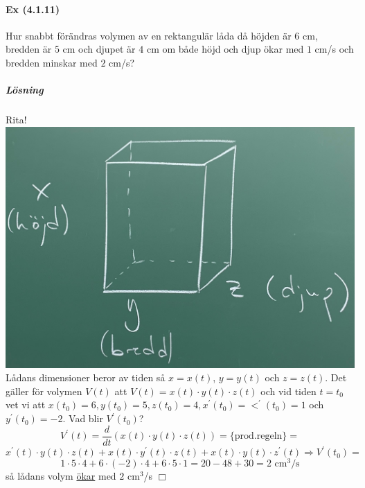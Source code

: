 \paragraph{Ex (4.1.11)} Hur snabbt förändras volymen av en rektangulär
låda då höjden är $6$ cm, bredden är $5$ cm och djupet är $4$ cm om både
höjd och djup ökar med $1$ cm/s och bredden minskar med $2$ cm/s?
\subparagraph{Lösning} Rita!\\
\includegraphics[scale=0.1]{lessons/lesson10/imgs/img01.jpg}\\
Lådans dimensioner beror av tiden så $x=x(t)$, $y=y(t)$ och $z=z(t)$.
Det gäller för volymen $V(t)$ att $V(t)=x(t)\cdot y(t)\cdot z(t)$
och vid tiden $t=t_0$ vet vi att $x(t_0)=6,y(t_0)=5,z(t_0)=4,x^\prime(t_0)=<^\prime(t_0)=1$ och $y^\prime(t_0)=-2$.
Vad blir $V^\prime(t_0)$?
\begin{equation*}
    V^\prime(t)=\frac{d}{dt}(x(t)\cdot y(t)\cdot z(t))=
    \{\text{prod.regeln}\}=
\end{equation*}
\begin{equation*}
    x^\prime(t)\cdot y(t)\cdot z(t) + x(t)\cdot y^\prime(t)\cdot z(t) + x(t)\cdot y(t)\cdot z^\prime(t)
    \Rightarrow V^\prime(t_0)=
\end{equation*}
\begin{equation*}
    1\cdot 5\cdot 4 + 6\cdot (-2)\cdot 4 + 6\cdot 5 \cdot 1=
    20-48+30=2\text{ cm}^3\text{/s}
\end{equation*}
så lådans volym \underline{ökar} med $2$ cm$^3$/s $\Box$


